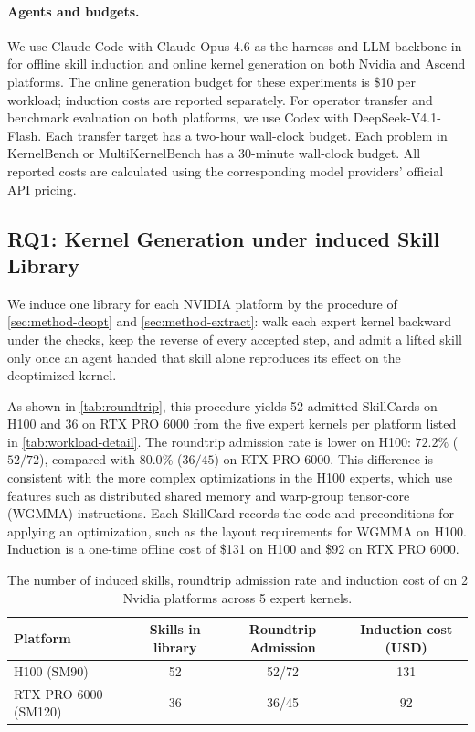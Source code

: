 \paragraph{Agents and budgets.}
We use Claude Code with Claude Opus 4.6 as the harness and LLM backbone  in \sys for offline skill induction and online kernel generation on both Nvidia and Ascend platforms. The online generation budget for these experiments is \$10 per workload; induction costs are reported separately. For operator transfer and benchmark evaluation on both platforms, we use Codex with DeepSeek-V4.1-Flash. Each transfer target has a two-hour wall-clock budget. Each problem in KernelBench or MultiKernelBench has a 30-minute wall-clock budget.
All reported costs are calculated using the corresponding model
providers' official API pricing.

\subsection{RQ1: Kernel Generation under induced Skill Library}
\label{sec:exp-induction}

We induce one library for each NVIDIA platform by the procedure of \autoref{sec:method-deopt} and \autoref{sec:method-extract}: walk each expert kernel backward under the checks, keep the reverse of every accepted step, and admit a lifted skill only once an agent handed that skill alone reproduces its effect on the deoptimized kernel.

As shown in \autoref{tab:roundtrip}, this procedure yields 52 admitted SkillCards on H100 and 36 on RTX PRO 6000 from the five expert kernels per platform listed in \autoref{tab:workload-detail}. The roundtrip admission rate is lower on H100: $72.2\%$ ($52/72$), compared with $80.0\%$ ($36/45$) on RTX PRO 6000. This difference is consistent with the more complex optimizations in the H100 experts, which use features such as distributed shared memory and warp-group tensor-core (WGMMA) instructions. Each SkillCard records the code and preconditions for applying an optimization, such as the layout requirements for WGMMA on H100. Induction is a one-time offline cost of \$131 on H100 and \$92 on RTX PRO 6000.


\begin{table}[h]
  \centering
  \small
  \setlength{\tabcolsep}{8pt}
  \begin{tabular}{@{}lccc@{}}
    \toprule
    \textbf{Platform} & \textbf{Skills in library} & \textbf{Roundtrip Admission} & \textbf{Induction cost (USD)} \\
    \midrule
    H100 (SM90)          & 52 & 52/72 & 131 \\
    RTX PRO 6000 (SM120) & 36 & 36/45 & 92 \\
    \bottomrule
  \end{tabular}
  \caption{The number of induced skills, roundtrip admission rate and induction cost of \sys{} on 2 Nvidia platforms across 5 expert kernels.}
  \label{tab:roundtrip}
\end{table}

